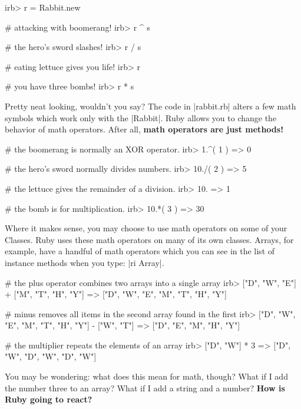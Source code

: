 \documentclass[12pt,twoside]{report}
\begin{document}
\begin{consolecode}

 irb> r = Rabbit.new

 # attacking with boomerang!
 irb> r ^ s

 # the hero's sword slashes!
 irb> r / s

 # eating lettuce gives you life!
 irb> r %

 # you have three bombs!
 irb> r * s

\end{consolecode}


Pretty neat looking, wouldn't you say?  The code in
\rubyinline|rabbit.rb| alters a few math symbols which
work only with the \rubyinline|Rabbit|.  Ruby allows
you to change the behavior of math operators.  After all, {\bf math
  operators are just methods!}


\begin{consolecode}

 # the boomerang is normally an XOR operator.
 irb> 1.^( 1 )
   => 0

 # the hero's sword normally divides numbers.
 irb> 10./( 2 )
   => 5

 # the lettuce gives the remainder of a division.
 irb> 10.%
   => 1

 # the bomb is for multiplication.
 irb> 10.*( 3 )
   => 30

\end{consolecode}


Where it makes sense, you may choose to use math operators on some of
your Classes.  Ruby uses these math operators on many of its own
classes.  Arrays, for example, have a handful of math operators which
you can see in the list of instance methods when you type:
\rubyinline|ri Array|.


\begin{consolecode}

 # the plus operator combines two arrays into a single array
 irb> ["D", "W", "E"] + ["M", "T", "H", "Y"]
   => ["D", "W", "E", "M", "T", "H", "Y"]

 # minus removes all items in the second array found in the first
 irb> ["D", "W", "E", "M", "T", "H", "Y"] - ["W", "T"]
   => ["D", "E", "M", "H", "Y"]

 # the multiplier repeats the elements of an array
 irb> ["D", "W"] * 3
   => ["D", "W", "D", "W", "D", "W"]

\end{consolecode}


You may be wondering: what does this mean for math, though?  What if I
add the number three to an array?  What if I add a string and a
number?  {\bf How is Ruby going to react?}
\end{document}
